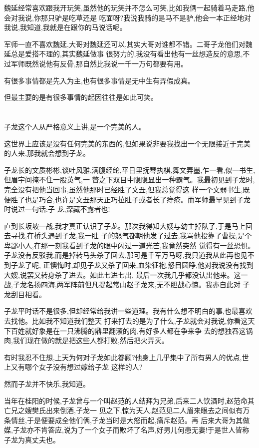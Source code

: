 ﻿\documentclass[12pt,twocolumn]{article}
\begin{document}
魏延经常喜欢跟我开玩笑,虽然他的玩笑并不怎么可笑,比如我俩一起骑着马走路,他会对我说,你那只驴是吃草还是
吃面呀?我说我骑的是马不是驴,他会一本正经地对我说,我知道,我就是在跟你的马说话呢。

军师一直不喜欢魏延,大哥对魏延还可以,其实大哥对谁都不错。二哥子龙他们对魏延总是爱搭不理的,其实魏延做事
很努力的,我没有看出他有一丝想造反的意思,不过军师既然说他有反骨,那自然比我说一千一万句都要有用。

有很多事情都是先入为主,也有很多事情是无中生有弄假成真。

但最主要的是有很多事情的起因往往是如此可笑。

\section{}

子龙这个人从严格意义上讲,是一个完美的人。

这世界上应该是没有任何完美的东西的,但如果说非要我找出一个无限接近于完美的人来,那我就会想到子龙。

子龙长的文质彬彬,谈吐风雅,满腹经纶,平日里抚琴执棋,舞文弄墨,乍一看,似一书生,但眉宇间掩不住一股英气,一
瞥之下双目中隐隐显出一种霸气。我最初见到子龙时,完全没有把他当回事,虽然他那时已经胜了文丑,但我总觉得这
样一个文弱书生,既便胜了也是巧合,也许是文丑那天正巧拉肚子或者长了痔疮。而军师最早见到子龙时说过一句话:子
龙,深藏不露者也!

直到长坂坡一战,我才真正认识了子龙。那次我得知大嫂与幼主掉队了,于是马上回去寻找,在桥头遇到子龙,我一肚
子的怒气都朝他发了过去,我骂他投靠了曹操,是个卑鄙小人,在那一刻我看到子龙的眼中闪过一道光芒,我竟然突然
觉得有一丝恐惧。子龙没有反驳我,而是掉转马头杀了回去,那可是千军万马呀,我只道我从此再也见不到子龙了呢,
正懊悔时,却见子龙又杀了回来,血染征袍,怒目圆睁,他对我说没有找到大嫂,说罢又转身杀了进去。如此七进七出,
最后一次我几乎都没认出他来。这一战,子龙名扬四海,两军阵前但凡提起常山赵子龙来,无不胆战心惊。我亦自此对
子龙刮目相看。

子龙平时话不是很多,但却经常给我讲一些道理。我有什么想不明白的事,也最喜欢去找他。比如我不知道我们整天
打来打去的是为了什么,子龙就会对我说,你看这天下百姓就好象是在一只沸腾的鼎里翻滚的肉,有好多人都在争来争
去的想独吞这锅肉,我们现在做的就是把这些人都打败,然后把火弄灭。

有时我忍不住想,上天为何对子龙如此眷顾?他身上几乎集中了所有男人的优点,世上又有哪个女子没有想过嫁给子龙
这样的人?

然而子龙并不快乐,我知道。

当年在桂阳的时候,子龙曾与一个叫赵范的人结拜为兄弟,后来二人饮酒时,赵范命其亡兄之嫂樊氏出来倒酒,子龙一
见之下,惊为天人,赵范见二人眉来眼去之间似有万条情丝,于是便要成全他们俩,子龙当时是大怒而起,痛斥赵范。再
后来大哥为其做媒,子龙亦不肯答应,说为了一个女子而败坏了名声,好男儿何患无妻!于是世人皆称子龙为真丈夫也。
\end{document}
